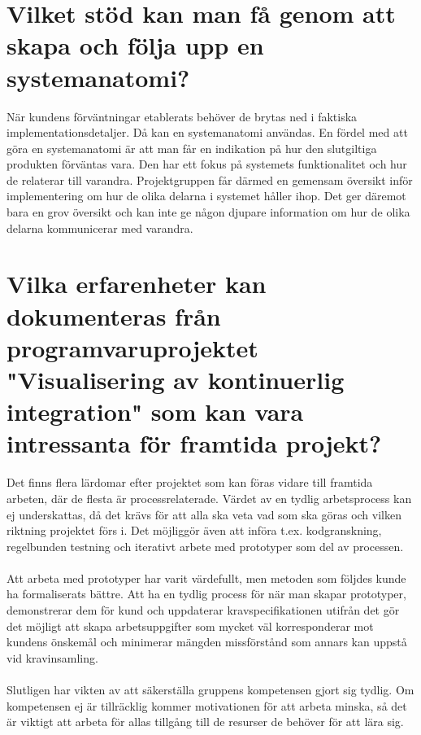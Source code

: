 \section{Vilket stöd kan man få genom att skapa och följa upp en systemanatomi?}
När kundens förväntningar etablerats behöver de brytas ned i faktiska implementationsdetaljer. Då kan en systemanatomi användas. En fördel med att göra en systemanatomi är att man får en indikation på hur den slutgiltiga produkten förväntas vara. Den har ett fokus på systemets funktionalitet och hur de relaterar till varandra. Projektgruppen får därmed en gemensam översikt inför implementering om hur de olika delarna i systemet håller ihop. Det ger däremot bara en grov översikt och kan inte ge någon djupare information om hur de olika delarna kommunicerar med varandra.

\section{Vilka erfarenheter kan dokumenteras från programvaruprojektet "Visualisering av kontinuerlig integration" som kan vara intressanta för framtida projekt?}
Det finns flera lärdomar efter projektet som kan föras vidare till framtida
arbeten, där de flesta är processrelaterade. Värdet av en tydlig
arbetsprocess kan ej underskattas, då det krävs för att alla ska veta
vad som ska göras och vilken riktning projektet förs i. Det möjliggör även
att införa t.ex. kodgranskning, regelbunden testning och iterativt arbete
med prototyper som del av processen.
\\ \\
Att arbeta med prototyper har varit värdefullt, men metoden som följdes
kunde ha formaliserats bättre. Att ha en tydlig process för när man skapar prototyper,
demonstrerar dem för kund och uppdaterar kravspecifikationen utifrån det
gör det möjligt att skapa arbetsuppgifter som mycket väl korresponderar mot kundens
önskemål och minimerar mängden missförstånd som annars kan uppstå vid kravinsamling.
\\ \\
Slutligen har vikten av att säkerställa gruppens kompetensen gjort sig tydlig. Om
kompetensen ej är tillräcklig kommer motivationen för att arbeta minska, så det
är viktigt att arbeta för allas tillgång till de resurser de behöver för att
lära sig.
